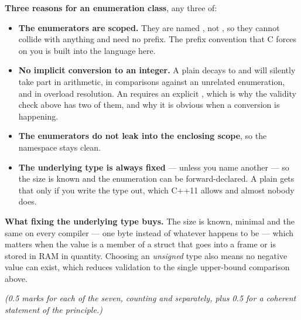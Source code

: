 \medskip
\textbf{Three reasons for an enumeration class}, any three of: 
\begin{itemize}
  \item \textbf{The enumerators are scoped.} They are named , not
    , so they cannot collide with anything and need no  prefix.
    The prefix convention that C forces on you is built into the language here.
  \item \textbf{No implicit conversion to an integer.} A plain  decays to  and
    will silently take part in arithmetic, in comparisons against an unrelated enumeration, and in
    overload resolution. An  requires an explicit , which is why
    the validity check above has two of them, and why it is obvious when a conversion is happening.
  \item \textbf{The enumerators do not leak into the enclosing scope}, so the namespace stays clean.
  \item \textbf{The underlying type is always fixed} ---  unless you name another --- so
    the size is known and the enumeration can be forward-declared. A plain  gets that
    only if you write the type out, which C++11 allows and almost nobody does.
\end{itemize}

\textbf{What fixing the underlying type buys.} The size is known, minimal and the same on every
compiler --- one byte instead of whatever  happens to be --- which matters when the value
is a member of a struct that goes into a frame or is stored in RAM in quantity. Choosing an
\emph{unsigned} type also means no negative value can exist, which reduces validation to the single
upper-bound comparison above. 

{\itshape (0.5 marks for each of the seven, counting  and 
separately, plus 0.5 for a coherent statement of the principle.)\par}

